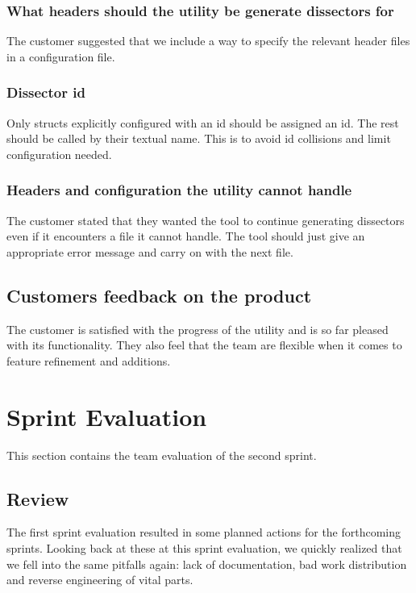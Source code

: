 \subsubsection{What headers should the utility be generate dissectors for}
The customer suggested that we include a way to specify the relevant header files in a configuration file.

\subsubsection{Dissector id}
Only structs explicitly configured with an id should be assigned an id. The rest should be called by their textual name. This is to avoid id collisions and limit configuration needed.

\subsubsection{Headers and configuration the utility cannot handle}
The customer stated that they wanted the tool to continue generating dissectors even if it encounters a file it cannot handle. The tool should just give an appropriate error message and carry on with the next file.

\subsection{Customers feedback on the product}
The customer is satisfied with the progress of the utility and is so far pleased with its functionality. They also feel that the team are flexible when it comes to feature refinement and additions. 

\section{Sprint Evaluation}
This section contains the team evaluation of the second sprint.

\subsection{Review}
The first sprint evaluation resulted in some planned actions for the forthcoming sprints. Looking back at these at this sprint evaluation, we quickly realized that we fell into the same pitfalls again: lack of documentation, bad work distribution and reverse engineering of vital parts.

